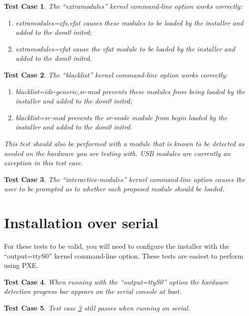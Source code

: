 \documentclass[a4paper]{article}
\newtheorem{testcase}{Test Case}
\begin{document}
\begin{testcase}
The ``extramodules'' kernel command-line option works correctly:
\begin{enumerate}
\item extramodules=xfs,vfat causes these modules to be loaded by the
  installer and added to the dom0 initrd;
\item extramodules=vfat cause the vfat module to be loaded by the
  installer and added to the dom0 initrd.
\end{enumerate}
\end{testcase}

\begin{testcase}
The ``blacklist'' kernel command-line option works correctly:
\begin{enumerate}
\item blacklist=ide-generic,sr-mod prevents these modules from being
  loaded by the installer and added to the dom0 initrd;
\item blacklist=sr-mod prevents the sr-mode module from begin loaded
  by the installer and added to the dom0 initrd.
\end{enumerate}
This test should also be performed with a module that is known to be
detected as needed on the hardware you are testing with.  USB modules
are currently an exception in this test case.
\end{testcase}

\begin{testcase} \label{tc:interactive-modules}
The ``interactive-modules'' kernel command-line option causes the user
to be prompted as to whether each proposed module should be loaded.
\end{testcase}

\section{Installation over serial}

For these tests to be valid, you will need to configure the installer
with the ``output=ttyS0'' kernel command-line option.  These tests are
easiest to perform using PXE.

\begin{testcase}
When running with the ``output=ttyS0'' option the hardware detection
progress bar appears on the serial console at boot.
\end{testcase}

\begin{testcase}
Test case \ref{tc:interactive-modules} still passes when running on serial.
\end{testcase}
\end{document}

